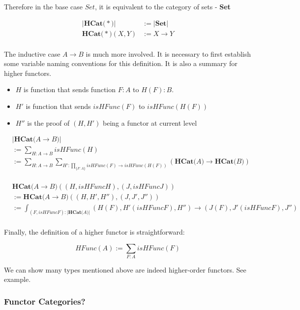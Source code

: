 Therefore in the base case $Set$, it is equivalent to the category of sets - \textbf{Set}

\begin{align*}
\lvert\textbf{HCat(} * \textbf{)}\rvert &:= \lvert\textbf{Set}\rvert \\
\textbf{HCat(} * \textbf{)} (X , Y) &:= X \to Y \\
\end{align*}

The inductive case $A \to B$ is much more involved. It is necessary to first establish some variable naming conventions for this definition. It is also a summary for higher functors.

\begin{itemize}
  \item{$H$ is function that sends function $F : A$ to $H(F) : B$}.
  \item{$H'$ is function that sends $isHFunc(F)$ to $isHFunc(H(F))$}
  \item{$H''$ is the proof of $(H , H')$ being a functor at current level}
\end{itemize}

\begin{align*}
& \lvert\textbf{HCat(} A \to B \textbf{)}\rvert \\
&:= \sum_{H : A \to B} isHFunc(H) \\
&:= \sum_{H : A \to B} \sum_{H' : \prod_{\{F : A\}} isHFunc(F) \to isHFunc(H(F))} (\textbf{HCat(} A \textbf{)} \to \textbf{HCat(} B \textbf{)}) \\
\end{align*}

\begin{align*}
& \textbf{HCat(} A \to B \textbf{)} ((H , isHFuncH) , (J, isHFuncJ)) \\
&:= \textbf{HCat(} A \to B \textbf{)} ((H , H' , H'') , (J, J' , J'')) \\
&:= \int_{(F , isHFuncF) : \lvert\textbf{HCat(} A \textbf{)}\rvert} (H(F) , H'(isHFuncF), H'') \to (J(F) , J'(isHFuncF), J'') \\
\end{align*}

Finally, the definition of a higher functor is straightforward:

\[ HFunc(A) := \sum_{F : A} isHFunc(F) \]

We can show many types mentioned above are indeed higher-order functors. See example.

\subsubsection*{Functor Categories?}

